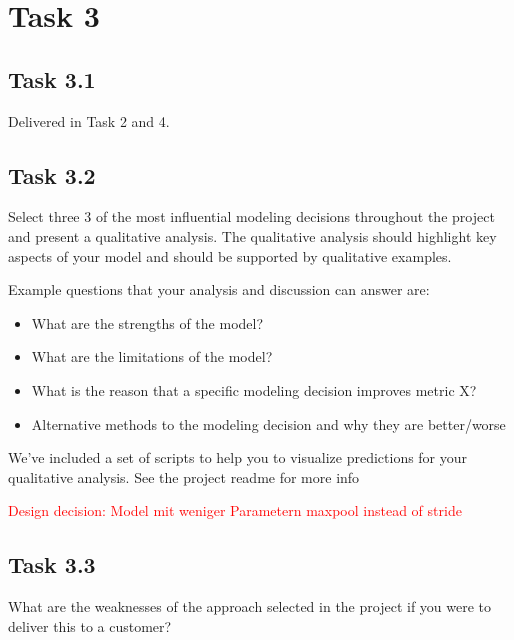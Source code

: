 \documentclass{article}
\begin{document}
\section*{Task 3}

\subsection*{Task 3.1}
Delivered in Task 2 and 4.

\subsection*{Task 3.2}
Select three 3 of the most influential modeling decisions throughout the project and present a qualitative analysis. The qualitative analysis should highlight key aspects of your model and should be supported by qualitative
examples.

Example questions that your analysis and discussion can answer are:
\begin{itemize}
    \item What are the strengths of the model?
    \item What are the limitations of the model?
    \item What is the reason that a specific modeling decision improves metric X?
    \item Alternative methods to the modeling decision and why they are better/worse
\end{itemize}

We’ve included a set of scripts to help you to visualize predictions for your qualitative analysis. See the project
readme for more info

\textcolor{red}{Design decision: Model mit weniger Parametern maxpool instead of stride}

\subsection*{Task 3.3}
What are the weaknesses of the approach selected in the project if you were to deliver this to a customer?
\end{document}
